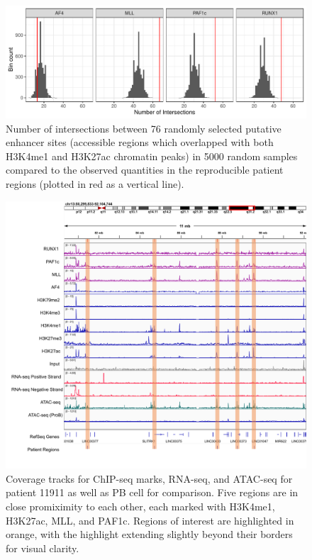 \begin{figure}
    \centering
    \includegraphics[width=\textwidth]{plot/ch5/mll_enhancer_overlap.pdf}
    \caption{Number of intersections between 76 randomly selected putative enhancer sites (accessible regions which overlapped with both H3K4me1 and H3K27ac chromatin peaks) in 5000 random samples compared to the observed quantities in the reproducible patient regions (plotted in red as a vertical line).}
    \label{fig:mll_enhancer_overlap}
\end{figure}

\begin{figure}
    \centering
    \includegraphics[width=\textwidth]{plot/ch5/enhancer_cluster.pdf}
    \caption{Coverage tracks for ChIP-seq marks, RNA-seq, and ATAC-seq for patient 11911 as well as PB cell for comparison. Five regions are in close promiximity to each other, each marked with H3K4me1, H3K27ac, MLL, and PAF1c. Regions of interest are highlighted in orange, with the highlight extending slightly beyond their borders for visual clarity.}
    \label{fig:mll_enhancer_cluster}
\end{figure}



